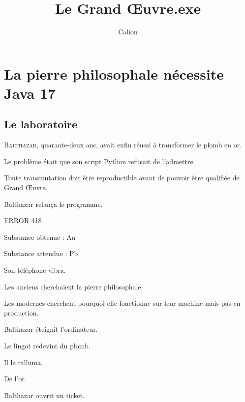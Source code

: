 \documentclass[hardcover,french,color]{scriptorium}
\title{Le Grand Œuvre.exe}
\author{Calion}
\begin{document}
  \maketitle

  \mainmatter

  \chapter{La pierre philosophale nécessite Java 17}

  \section{Le laboratoire}

  \lettrine{B}{althazar}, quarante-deux ans, avait enfin réussi à transformer le plomb en or.

  Le problème était que son script Python refusait de l'admettre.

  \scenebreak

  \scriptoriumnote
  {
    Toute transmutation doit être reproductible avant de pouvoir être qualifiée de Grand Œuvre.
  }

  Balthazar relança le programme.

  \scriptoriumquote
  {
    ERROR 418

    Substance obtenue : Au

    Substance attendue : Pb
  }

  Son téléphone vibra.




  \calionnote
  {
    Les anciens cherchaient la pierre philosophale.

    Les modernes cherchent pourquoi elle fonctionne sur leur machine mais pas en production.
  }

  Balthazar éteignit l'ordinateur.

  Le lingot redevint du plomb.

  Il le ralluma.

  De l'or.

  Balthazar ouvrit un ticket.

  \theend
\end{document}
